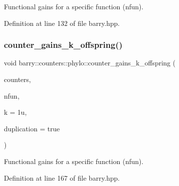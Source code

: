 Functional gains for a specific function ({\ttfamily nfun}). 



Definition at line 132 of file barry.\+hpp.

\mbox{\label{namespacebarry_1_1counters_1_1phylo_a1a2118168c3e375edf94fc6b53969a6b}} 
\subsubsection{\texorpdfstring{counter\+\_\+gains\+\_\+k\+\_\+offspring()}{counter\_gains\_k\_offspring()}}
{\footnotesize\ttfamily void barry\+::counters\+::phylo\+::counter\+\_\+gains\+\_\+k\+\_\+offspring (\begin{DoxyParamCaption}\item[{\hyperlink{namespacebarry_1_1counters_1_1phylo_a4e401ffe66d04091343dcffaf915f8c3}{Phylo\+Counters} $\ast$}]{counters,  }\item[{std\+::vector$<$ \hyperlink{namespacebarry_a11dfc53ddb4672278319aa04f1e09a6c}{uint} $>$}]{nfun,  }\item[{\hyperlink{namespacebarry_a11dfc53ddb4672278319aa04f1e09a6c}{uint}}]{k = {\ttfamily 1u},  }\item[{bool}]{duplication = {\ttfamily true} }\end{DoxyParamCaption})\hspace{0.3cm}{\ttfamily [inline]}}



Functional gains for a specific function ({\ttfamily nfun}). 



Definition at line 167 of file barry.\+hpp.

\mbox{\label{namespacebarry_1_1counters_1_1phylo_a680cd7516f66f06eb8a27d8b252b53ed}} 
